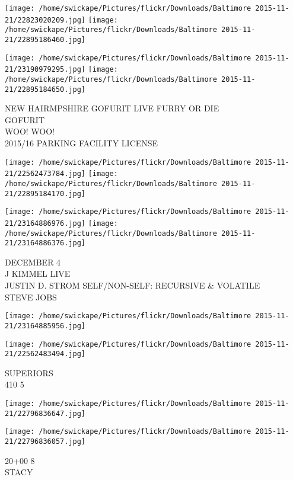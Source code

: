 \documentclass[10pt,letterpaper]{article}
\begin{document}
\texttt{[image: /home/swickape/Pictures/flickr/Downloads/Baltimore 2015-11-21/22823020209.jpg]}
\texttt{[image: /home/swickape/Pictures/flickr/Downloads/Baltimore 2015-11-21/22895186460.jpg]}

\texttt{[image: /home/swickape/Pictures/flickr/Downloads/Baltimore 2015-11-21/23190979295.jpg]}
\texttt{[image: /home/swickape/Pictures/flickr/Downloads/Baltimore 2015-11-21/22895184650.jpg]}

NEW HAIRMPSHIRE GOFURIT LIVE FURRY OR DIE\\
GOFURIT\\
WOO!  WOO!\\
2015/16 PARKING FACILITY LICENSE\\
\pagebreak

\texttt{[image: /home/swickape/Pictures/flickr/Downloads/Baltimore 2015-11-21/22562473784.jpg]}
\texttt{[image: /home/swickape/Pictures/flickr/Downloads/Baltimore 2015-11-21/22895184170.jpg]}

\texttt{[image: /home/swickape/Pictures/flickr/Downloads/Baltimore 2015-11-21/23164886976.jpg]}
\texttt{[image: /home/swickape/Pictures/flickr/Downloads/Baltimore 2015-11-21/23164886376.jpg]}

DECEMBER 4\\
J KIMMEL LIVE\\
JUSTIN D. STROM SELF/NON{-}SELF: RECURSIVE \& VOLATILE\\
STEVE JOBS\\
\pagebreak

\texttt{[image: /home/swickape/Pictures/flickr/Downloads/Baltimore 2015-11-21/23164885956.jpg]}

\vspace{0.25in}
\texttt{[image: /home/swickape/Pictures/flickr/Downloads/Baltimore 2015-11-21/22562483494.jpg]}

SUPERIORS\\
410 5\\
\pagebreak

\texttt{[image: /home/swickape/Pictures/flickr/Downloads/Baltimore 2015-11-21/22796836647.jpg]}

\vspace{0.25in}
\texttt{[image: /home/swickape/Pictures/flickr/Downloads/Baltimore 2015-11-21/22796836057.jpg]}

20+00 8\\
STACY\\
\pagebreak
\end{document}
